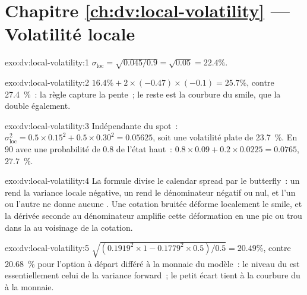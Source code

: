 \section*{Chapitre \ref{ch:dv:local-volatility} --- Volatilité locale}

\begin{solution}{exo:dv:local-volatility:1}
$\sigma_{\mathrm{loc}}=\sqrt{0.045/0.9}=\sqrt{0.05}=22.4\%$.
\end{solution}

\begin{solution}{exo:dv:local-volatility:2}
$16.4\%+2\times(-0.47)\times(-0.1)=25.7\%$, contre 27.4~\%~: la règle capture la pente~; le reste est la
courbure du smile, que la  double également.
\end{solution}

\begin{solution}{exo:dv:local-volatility:3}
Indépendante du spot~: $\sigma_{\mathrm{loc}}^2=0.5\times0.15^2+0.5\times0.30^2=0.05625$, soit une volatilité plate de 23.7~\%. En 90
avec une probabilité de 0.8 de l'état haut~: $0.8\times0.09+0.2\times0.0225=0.0765$, 27.7~\%.
\end{solution}

\begin{solution}{exo:dv:local-volatility:4}
La formule divise le calendar spread par le butterfly~: un  rend la variance locale
négative, un  rend le dénominateur négatif ou nul, et l'un ou l'autre ne donne aucune .
Une cotation bruitée déforme localement le smile, et la dérivée seconde au dénominateur amplifie cette déformation en une
pic ou trou dans la  au voisinage de la cotation.
\end{solution}

\begin{solution}{exo:dv:local-volatility:5}
$\sqrt{(0.1919^2\times1-0.1779^2\times0.5)/0.5}=20.49\%$, contre 20.68~\% pour l'option à départ différé à la
monnaie du modèle~: le niveau du  est essentiellement celui de la variance forward~; le petit écart tient à la courbure du
 à la monnaie.
\end{solution}

